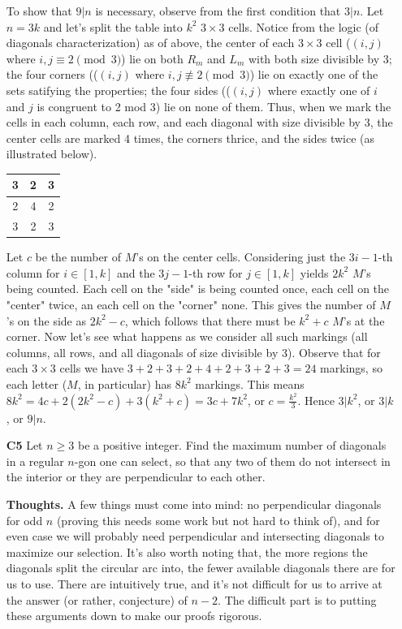 \documentclass[11pt,a4paper]{article}
\begin{document}
\begin{itemize}
To show that $9|n$ is necessary, observe from the first condition that $3|n$. 
Let $n=3k$ and let's split the table into $k^2$ $3\times 3$ cells. 
Notice from the logic (of diagonals characterization) as of above, 
the center of each $3\times 3 $ cell ($(i, j)$ where $i, j\equiv 2\pmod{3}$) lie on both $R_m$ and $L_m$ with both size divisible by 3; 
the four corners (($(i, j)$ where $i, j\not\equiv 2\pmod{3}$) lie on exactly one of the sets satifying the properties; 
the four sides (($(i, j)$ where exactly one of $i$ and $j$ is congruent to 2 mod 3) lie on none of them. 
Thus, when we mark the cells in each column, each row, and each diagonal with size divisible by 3, 
the center cells are marked 4 times, the corners thrice, and the sides twice (as illustrated below). 
\begin{center}
\begin{tabular}{|c|c|c|}
\hline
3 & 2 & 3\\
\hline
2 & 4 & 2\\
\hline
3 & 2 & 3\\
\hline
\end{tabular}
\end{center}
Let $c$ be the number of $M$'s on the center cells. 
Considering just the $3i-1$-th column for $i\in [1, k]$ and the $3j-1$-th row for $j\in [1, k]$ yields $2k^2$ $M$'s being counted. 
Each cell on the "side" is being counted once, each cell on the "center" twice, an each cell on the "corner" none. 
This gives the number of $M$'s on the side as $2k^2-c$, which follows that there must be $k^2+c$ $M$'s at the corner. 
Now let's see what happens as we consider all such markings (all columns, all rows, and all diagonals of size divisible by 3). 
Observe that for each $3\times 3$ cells we have $3+2+3+2+4+2+3+2+3=24$ markings, so each letter ($M$, in particular) has $8k^2$ markings. 
This means $8k^2=4c+2(2k^2-c)+3(k^2+c)=3c+7k^2$, or $c=\frac{k^2}{3}$. 
Hence $3|k^2$, or $3|k$, or $9|n$. 

\newpage
\item[\textbf{C5}]
Let $n \geq 3$ be a positive integer. Find the maximum number of diagonals in a regular $n$-gon one can select, so that any two of them do not intersect in the interior or they are perpendicular to each other. 

\textbf{Thoughts.} A few things must come into mind: no perpendicular diagonals for odd $n$ (proving this needs some work but not hard to think of), and for even case we will probably need perpendicular and intersecting diagonals to maximize our selection. It's also worth noting that, the more regions the diagonals split the circular arc into, the fewer available diagonals there are for us to use. 
There are intuitively true, and it's not difficult for us to arrive at the answer (or rather, conjecture) of $n-2$. The difficult part is to putting these arguments down to make our proofs rigorous. 


\end{itemize}
\end{document}
